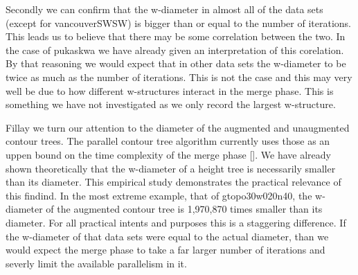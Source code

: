 Secondly we can confirm that the w-diameter in almost all of the data sets (except for vancouverSWSW) is bigger than or equal to the number of iterations. This leads us to believe that there may be some correlation between the two. In the case of pukaskwa we have already given an interpretation of this corelation. By that reasoning we would expect that in other data sets the w-diameter to be twice as much as the number of iterations. This is not the case and this may very well be due to how different w-structures interact in the merge phase. This is something we have not investigated as we only record the largest w-structure.


Fillay we turn our attention to the diameter of the augmented and unaugmented contour trees. The parallel contour tree algorithm currently uses those as an uppen bound on the time complexity of the merge phase []. We have already shown theoretically that the w-diameter of a height tree is necessarily smaller than its diameter. This empirical study demonstrates the practical relevance of this findind. In the most extreme example, that of gtopo30w020n40, the w-diameter of the augmented contour tree is 1,970,870 times smaller than its diameter. For all practical intents and purposes this is a staggering difference. If the w-diameter of that data sets were equal to the actual diameter, than we would expect the merge phase to take a far larger number of iterations and severly limit the available parallelism in it.


